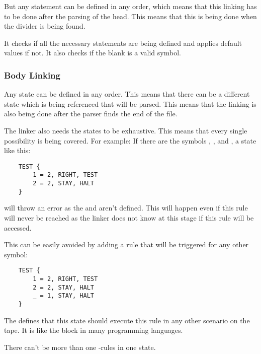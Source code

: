 But any statement can be defined in any order, which means that this linking has to be done after
the parsing of the head. This means that this is being done when the divider is being found.

It checks if all the necessary statements are being defined and applies default values if not.
It also checks if the blank is a valid symbol.

\subsubsection{Body Linking}
Any state can be defined in any order. This means that there can be a different state which is being
referenced that will be parsed. This means that the linking is also being done after the parser finds the end
of the file.

The linker also needs the states to be exhaustive. This means that every single possibility is being covered.
For example: If there are the symbols , ,  and , a state like this:
\begin{verbatim}
    TEST {
        1 = 2, RIGHT, TEST
        2 = 2, STAY, HALT
    }
\end{verbatim}
will throw an error as the  and  aren't defined. This will happen even if this rule will never be reached
as the linker does not know at this stage if this rule will be accessed.

This can be easily avoided by adding a rule that will be triggered for any other symbol:
\begin{verbatim}
    TEST {
        1 = 2, RIGHT, TEST
        2 = 2, STAY, HALT
        _ = 1, STAY, HALT
    }
\end{verbatim}

The \code{\_} defines that this state should execute this rule in any other scenario on the tape. 
It is like the  block in many programming languages.

There can't be more than one \code{\_}-rules in one state.
